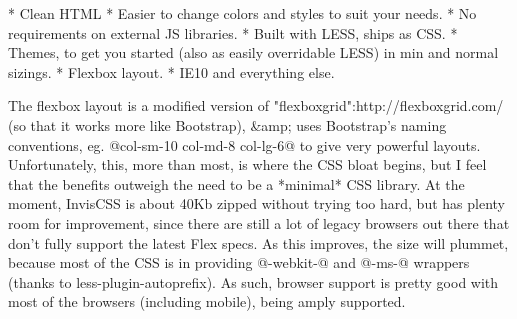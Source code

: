* Clean HTML
* Easier to change colors and styles to suit your needs. 
* No requirements on external JS libraries.
* Built with LESS, ships as CSS.
* Themes, to get you started (also as easily overridable LESS) in min and normal sizings.
* Flexbox layout.
* IE10 and everything else.

The flexbox layout is a modified version of "flexboxgrid":http://flexboxgrid.com/ (so that it works more like Bootstrap), &amp; uses Bootstrap's naming conventions, eg. @col-sm-10 col-md-8 col-lg-6@ to give very powerful layouts. Unfortunately, this, more than most, is where the CSS bloat begins, but I feel that the benefits outweigh the need to be a *minimal* CSS library. At the moment, InvisCSS is about 40Kb zipped without trying too hard, but has plenty room for improvement, since there are still a lot of legacy browsers out there that don't fully support the latest Flex specs. As this improves, the size will plummet, because most of the CSS is in providing @-webkit-@ and @-ms-@ wrappers (thanks to less-plugin-autoprefix). As such, browser support is pretty good with most of the browsers (including mobile), being amply supported.



